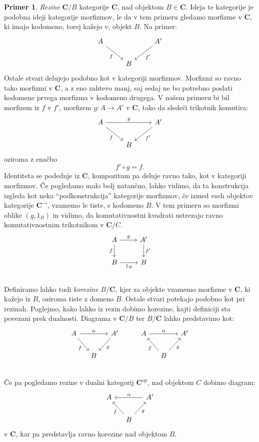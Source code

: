 \documentclass[12pt,a4paper]{book}
\theoremstyle{definition}
\theoremstyle{plain}
\theoremstyle{definition}
\newtheorem{primer}{Primer}[section]
\theoremstyle{remark}
\newcommand{\cat}[1]{\textbf{#1}}
\begin{document}
\begin{primer}
\emph{Rezine} $\cat{C}/B$ kategorije $\cat{C}$, nad objektom $B \in \cat{C}$. Ideja te kategorije je podobna ideji kategorije morfizmov, le da v tem primeru gledamo morfizme v $\cat{C}$, ki imajo kodomeno, torej kažejo v, objekt $B$. Na primer:
%
\[ \begin{tikzcd}
A \arrow[rd, "f"'] & & \arrow[ld, "f'"] A' \\
& B &
\end{tikzcd} \]
%
Ostale stvari delujejo podobno kot v kategoriji morfizmov. Morfizmi so ravno tako morfizmi v $\cat{C}$, a z eno zahtevo manj, saj sedaj ne bo potrebno poslati kodomene prvega morfizma v kodomeno drugega. V našem primeru bi bil morfizem iz $f$ v $f'$, morfizem $g : A \to A'$ v $\cat{C}$, tako da sledeči trikotnik komutira:
%
\[ \begin{tikzcd}
A \arrow[rd, "f"'] \ar[rr, "g"] & & \arrow[ld, "f'"] A' \\
& B &
\end{tikzcd} \]
oziroma z enačbo
$$f' \circ g = f.$$
Identiteta se podeduje iz $\cat{C}$, kompozitum pa deluje ravno tako, kot v kategoriji morfizmov. Če pogledamo malo bolj natančno, lahko vidimo, da ta konstrukcija izgleda kot neka "`podkonstrukcija"' kategorije morfizmov, če izmed vseh objektov kategorije $\cat{C}^{\rightarrow}$, vzamemo le tiste, s kodomeno $B$. V tem primeru so morfizmi oblike $(g, 1_B)$ in vidimo, da komutativnostni kvadrati ustrezajo ravno komutativnostnim trikotnikom v $\cat{C}/C$.
%
\[ \begin{tikzcd}
A \ar[d, "f"'] \ar[r, "g"] & A' \ar[d, "f'"] \\
B \ar[r, "1_B"'] & B \\
\end{tikzcd} \]
%
Definiramo lahko tudi \emph{korezine} $B/\cat{C}$, kjer za objekte vzamemo morfizme v $\cat{C}$, ki kažejo iz $B$, oziroma tiste z domeno $B$. Ostale stvari potekajo podobno kot pri rezinah.
Poglejmo, kako lahko iz rezin dobimo korezine, kajti definiciji sta povezani prek dualnosti.
Diagrama v $\cat{C}/B$ ter $B/\cat{C}$ lahko predstavimo kot:
$$\begin{tikzcd}[column sep=small]
A \ar[dr, "f"'] \ar[rr, "\alpha"] & &  A' \ar[dl, "g"] & & A \ar[rr, "\alpha"] && A' \\
& B &  & & & B \ar[ul, "f"] \ar[ur, "g"'] & \\
\end{tikzcd}$$
Če pa pogledamo rezine v dualni kategorij $\cat{C}^{op}$, nad objektom $C$ dobimo diagram:
$$\begin{tikzcd}[column sep=small]
A && A' \ar[ll, "\alpha"'] \\
& B \ar[ul, "f"] \ar[ur, "g"'] &
\end{tikzcd}$$
v $\cat{C}$, kar pa predstavlja ravno korezine nad objektom $B$.

\end{primer}
\end{document}

